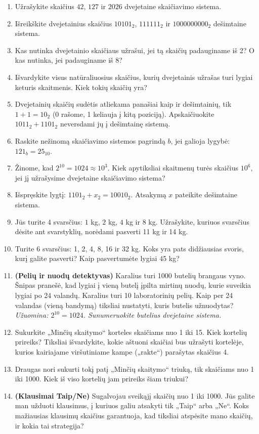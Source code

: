 \documentclass[11pt,a4paper]{scrartcl}
\begin{document}
\begin{enumerate}
    \renewcommand{\labelenumi}{\textbf{\theenumi.}}
    
    \item Užrašykite skaičius $42$, $127$ ir $2026$ dvejetaine skaičiavimo sistema.
    \item Išreikškite dvejetainius skaičius $10101_2$, $111111_2$ ir $1000000000_2$ dešimtaine sistema.
    \item Kas nutinka dvejetainio skaičiaus užrašui, jei tą skaičių padauginame iš 2? O kas nutinka, jei padauginame iš 8?
    \item Išvardykite visus natūraliuosius skaičius, kurių dvejetainis užrašas turi lygiai keturis skaitmenis. Kiek tokių skaičių yra?
    \item Dvejetainių skaičių sudėtis atliekama panašiai kaip ir dešimtainių, tik $1+1 = 10_2$ (0 rašome, 1 keliauja į kitą poziciją). Apskaičiuokite $1011_2 + 1101_2$ neversdami jų į dešimtainę sistemą.
    \item Raskite nežinomą skaičiavimo sistemos pagrindą $b$, jei galioja lygybė: $121_b = 25_{10}$.
    \item Žinome, kad $2^{10} = 1024 \approx 10^3$. Kiek apytiksliai skaitmenų turės skaičius $10^6$, jei jį užrašysime dvejetaine skaičiavimo sistema?
    \item Išspręskite lygtį: $1101_2 + x_2 = 10010_2$. Atsakymą $x$ pateikite dešimtaine sistema.
    
    \item Jūs turite 4 svarsčius: $1$ kg, $2$ kg, $4$ kg ir $8$ kg. Užrašykite, kuriuos svarsčius dėsite ant svarstyklių, norėdami pasverti 11 kg ir 14 kg.
    \item Turite 6 svarsčius: 1, 2, 4, 8, 16 ir 32 kg. Koks yra pats didžiausias svoris, kurį galite pasverti? Kaip pasvertumėte lygiai 45 kg?
    \item \textbf{(Pelių ir nuodų detektyvas)} Karalius turi 1000 butelių brangaus vyno. Šnipas pranešė, kad lygiai į vieną butelį įpilta mirtinų nuodų, kurie suveikia lygiai po 24 valandų. Karalius turi 10 laboratorinių pelių. Kaip per 24 valandas (vieną bandymą) tiksliai nustatyti, kuris butelis užnuodytas? \textit{Užuomina: $2^{10} = 1024$. Sunumeruokite butelius dvejetaine sistema.}
    \item Sukurkite „Minčių skaitymo“ korteles skaičiams nuo 1 iki 15. Kiek kortelių prireiks? Tiksliai išvardykite, kokie aštuoni skaičiai bus užrašyti kortelėje, kurios kairiajame viršutiniame kampe („rakte“) parašytas skaičius 4.
    \item Draugas nori sukurti tokį patį „Minčių skaitymo“ triuką, tik skaičiams nuo 1 iki 1000. Kiek iš viso kortelių jam prireiks šiam triukui?
    \item \textbf{(Klausimai Taip/Ne)} Sugalvojau sveikąjį skaičių nuo 1 iki 1000. Jūs galite man užduoti klausimus, į kuriuos galiu atsakyti tik „Taip“ arba „Ne“. Koks mažiausias klausimų skaičius garantuoja, kad tiksliai atspėsite mano skaičių, ir kokia tai strategija?
    

\end{enumerate}
\end{document}
